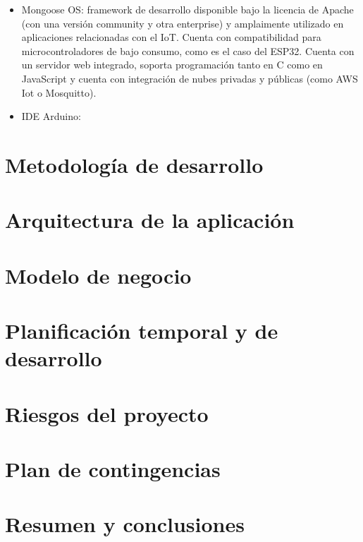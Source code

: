 \documentclass[runningheads]{llncs}
\begin{document}
\begin{itemize}
    \item Mongoose OS: framework de desarrollo disponible bajo la licencia de 
    Apache (con una versión community y otra enterprise) y amplaimente utilizado
    en aplicaciones relacionadas con el IoT. Cuenta con compatibilidad para 
    microcontroladores de bajo consumo, como es el caso del ESP32. Cuenta con un
    servidor web integrado, soporta programación tanto en C como en JavaScript y
    cuenta con integración de nubes privadas y públicas (como AWS Iot o 
    Mosquitto).
    
    \item IDE Arduino:
    
    
\end{itemize}

\section{Metodología de desarrollo}

\section{Arquitectura de la aplicación}

\section{Modelo de negocio}

\section{Planificación temporal y de desarrollo}

\section{Riesgos del proyecto}

\section{Plan de contingencias}

\section{Resumen y conclusiones}
\end{document}
